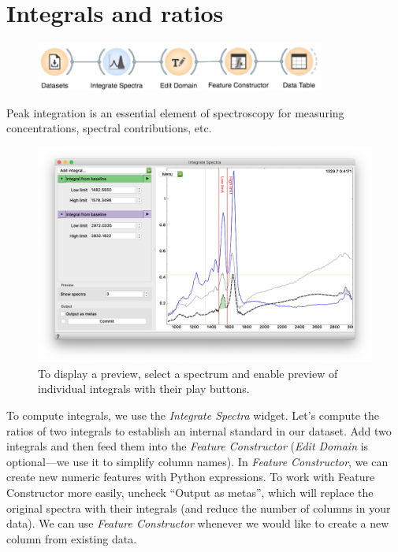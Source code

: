 \chapter{Integrals and ratios}
\label{ch:spectral_preprocessing}


\begin{figure}
    \centering
    \vspace{-3cm}
    \includegraphics[width=0.85\textwidth]{integrals-ratios-fig1.png}
    \label{fig:integrals-ratios-fig1}
\end{figure}

Peak integration is an essential element of spectroscopy for measuring concentrations, spectral contributions, etc. 

\begin{figure}
    \centering
    \includegraphics[width=\textwidth]{integrals-ratios-fig2.png}
    \caption{To display a preview, select a spectrum and enable preview of individual integrals with their play buttons.}
    \label{fig:integrals-ratios-fig2}
\end{figure}

To compute integrals, we use the \textit{Integrate Spectra} widget. Let’s compute the ratios of two integrals to establish an internal standard in our dataset. Add two integrals and then feed them into the \textit{Feature Constructor} (\textit{Edit Domain} is optional—we use it to simplify column names). In \textit{Feature Constructor}, we can create new numeric features with Python expressions.
To work with Feature Constructor more easily, uncheck “Output as metas”, which will replace the original spectra with their integrals (and reduce the number of columns in your data).
We can use \textit{Feature Constructor} whenever we would like to create a new column from existing data. 

